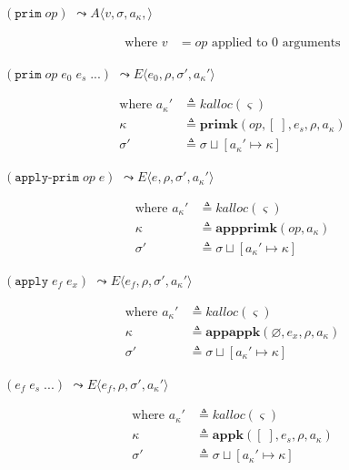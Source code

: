 \documentclass[12pt,draft]{article}
\newcommand{\primsyn}[2]{(\texttt{prim}\;#1\;#2\;...)}
\newcommand{\singleprimsyn}[1]{(\texttt{prim}\;#1)}
\newcommand{\applyprimsyn}[2]{(\texttt{apply-prim}\;#1\;#2)}
\newcommand{\applysyn}[2]{(\texttt{apply}\;#1\;#2)}
\newcommand{\env}[0]{\rho}
\newcommand{\store}[0]{\sigma}
\newcommand{\kaddr}[0]{a_{\kappa}}
\newcommand{\kont}[0]{\kappa}
\newcommand{\state}[0]{\varsigma}
\newcommand{\E}[4]{E\langle #1 , #2 , #3 , #4 \rangle}
\newcommand{\A}[4]{A\langle #1 , #2 , #3 , #4 \rangle}
\begin{document}
{\begin{multicols*}{2}
\begin{center}
  $\singleprimsyn{op}$
  $\leadsto \A{v}{\store}{\kaddr}{}$
\end{center}
\vspace{-7mm}
\begin{align*}
\text{where } v &= op \text{ applied to } 0 \text{ arguments}
\end{align*}
\begin{center}
  $\primsyn{op}{e_0\;e_s}$
  $\leadsto \E{e_0}{\env}{\store'}{\kaddr'}$
\end{center}
\vspace{-7mm}
\begin{align*}
  \text{where }
  \kaddr' &\triangleq kalloc(\state) \\
  \kont &\triangleq \textbf{primk}(op , [\;], e_s , \env , \kaddr) \\
  \store' &\triangleq \store \sqcup [\kaddr' \mapsto \kont]
\end{align*}
\begin{center}
  $\applyprimsyn{op}{e}$
  $\leadsto \E{e}{\env}{\store'}{\kaddr'}$
\end{center}
\vspace{-7mm}
\begin{align*}
  \text{where }
  \kaddr' &\triangleq kalloc(\state) \\
  \kont &\triangleq \textbf{appprimk}(op, \kaddr) \\
  \store' &\triangleq \store \sqcup [\kaddr' \mapsto \kont]
\end{align*}
\begin{center}
  $\applysyn{e_f}{e_x}$
  $\leadsto \E{e_f}{\env}{\store'}{\kaddr'}$
\end{center}
\vspace{-7mm}
\begin{align*}
  \text{where }
  \kaddr' &\triangleq kalloc(\state) \\
  \kont &\triangleq \textbf{appappk}(\varnothing, e_x, \env, \kaddr) \\
  \store' &\triangleq \store \sqcup [\kaddr' \mapsto \kont]
\end{align*}
\begin{center}
  $(e_f\;e_s\;...)$
  $\leadsto \E{e_f}{\env}{\store'}{\kaddr'}$
\end{center}
\vspace{-5mm}
\begin{align*}
  \text{where }
  \kaddr' &\triangleq kalloc(\state) \\
  \kont &\triangleq \textbf{appk}([\;] , e_s , \env , \kaddr) \\
  \store' &\triangleq \store \sqcup [\kaddr' \mapsto \kont]
\end{align*}
\end{multicols*}
} %
\end{document}
